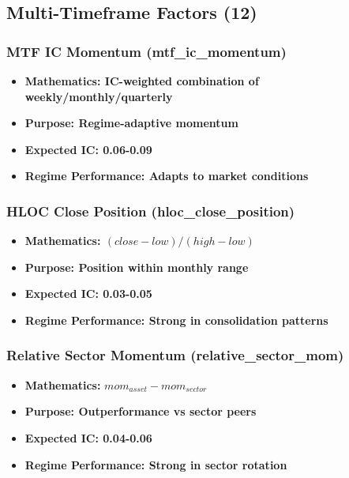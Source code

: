 \documentclass[11pt,letterpaper,openany]{book}
\begin{document}
\subsection{Multi-Timeframe Factors (12)}

\subsubsection{MTF IC Momentum (mtf\_ic\_momentum)}
\begin{itemize}
    \item \textbf{Mathematics: IC-weighted combination of weekly/monthly/quarterly}
    \item \textbf{Purpose: Regime-adaptive momentum}
    \item \textbf{Expected IC: 0.06-0.09}
    \item \textbf{Regime Performance: Adapts to market conditions}
\end{itemize}

\subsubsection{HLOC Close Position (hloc\_close\_position)}
\begin{itemize}
    \item \textbf{Mathematics: $(close - low) / (high - low)$}
    \item \textbf{Purpose: Position within monthly range}
    \item \textbf{Expected IC: 0.03-0.05}
    \item \textbf{Regime Performance: Strong in consolidation patterns}
\end{itemize}

\subsubsection{Relative Sector Momentum (relative\_sector\_mom)}
\begin{itemize}
    \item \textbf{Mathematics:} $mom_{asset} - mom_{sector}$
    \item \textbf{Purpose: Outperformance vs sector peers}
    \item \textbf{Expected IC: 0.04-0.06}
    \item \textbf{Regime Performance: Strong in sector rotation}
\end{itemize}
\end{document}
